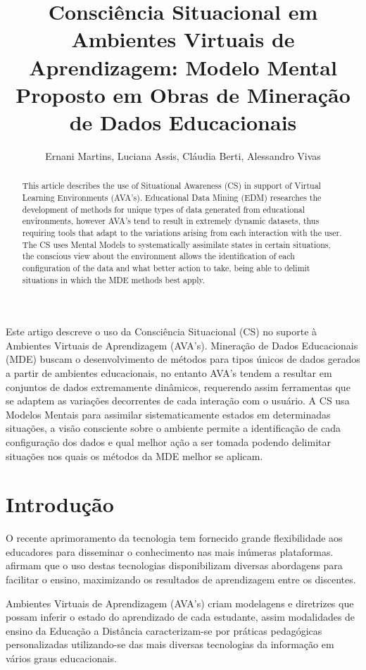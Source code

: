 \documentclass[12pt]{article}
\title{Consciência Situacional em Ambientes Virtuais de Aprendizagem:
	Modelo Mental Proposto em Obras de Mineração de Dados Educacionais }
\author{Ernani Martins\inst{1}, Luciana Assis\inst{2}, Cláudia Berti\inst{2}, Alessandro Vivas\inst{2} }
\begin{document}
 

\maketitle

\begin{abstract}
  This article describes the use of Situational Awareness (CS) in support of Virtual Learning Environments (AVA's). Educational Data Mining (EDM) researches the development of methods for unique types of data generated from educational environments, however AVA's tend to result in extremely dynamic datasets, thus requiring tools that adapt to the variations arising from each interaction with the user. The CS uses Mental Models to systematically assimilate states in certain situations, the conscious view about the environment allows the identification of each configuration of the data and what better action to take, being able to delimit situations in which the MDE methods best apply.
\end{abstract}
     
\begin{resumo} 
  Este artigo descreve o uso da Consciência Situacional (CS) no suporte à Ambientes Virtuais de Aprendizagem (AVA's). Mineração de Dados Educacionais (MDE) buscam o desenvolvimento de métodos para tipos únicos de dados gerados a partir de ambientes educacionais, no entanto AVA's tendem a resultar em conjuntos de dados extremamente dinâmicos, requerendo assim ferramentas que se adaptem as variações decorrentes de cada interação com o usuário. A CS usa Modelos Mentais para assimilar sistematicamente estados em determinadas situações, a visão consciente sobre o ambiente permite a identificação de cada configuração dos dados e qual melhor ação a ser tomada podendo delimitar situações nos quais os métodos da MDE melhor se aplicam.
\end{resumo}


\section{Introdução} 

O recente aprimoramento da tecnologia tem fornecido grande flexibilidade aos educadores para disseminar o conhecimento nas mais inúmeras plataformas. \cite{Ahmad_Shamsuddin_2010} afirmam que o uso destas tecnologias disponibilizam diversas abordagens para facilitar o ensino, maximizando os resultados de aprendizagem entre os discentes.

Ambientes Virtuais de Aprendizagem (AVA's) criam modelagens e diretrizes que possam inferir o estado do aprendizado de cada estudante, assim modalidades de ensino da Educação a Distância caracterizam-se por práticas pedagógicas personalizadas utilizando-se das mais diversas tecnologias da informação em vários graus educacionais. 
\end{document}
